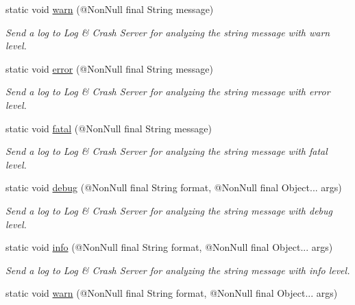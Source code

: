 \begin{DoxyCompactItemize}
static void \hyperlink{classcom_1_1toast_1_1android_1_1gamebase_1_1_gamebase_1_1_logger_ad6acf6b0724d6133534ddd54cc4f1b42}{warn} (@Non\+Null final String message)
\begin{DoxyCompactList}\small\item\em Send a log to Log \& Crash Server for analyzing the string message with warn level. \end{DoxyCompactList}\item 
static void \hyperlink{classcom_1_1toast_1_1android_1_1gamebase_1_1_gamebase_1_1_logger_a9d9271894eacdf4fe29901d4f0bf2254}{error} (@Non\+Null final String message)
\begin{DoxyCompactList}\small\item\em Send a log to Log \& Crash Server for analyzing the string message with error level. \end{DoxyCompactList}\item 
static void \hyperlink{classcom_1_1toast_1_1android_1_1gamebase_1_1_gamebase_1_1_logger_a372dc6703eff9082addb56057401a166}{fatal} (@Non\+Null final String message)
\begin{DoxyCompactList}\small\item\em Send a log to Log \& Crash Server for analyzing the string message with fatal level. \end{DoxyCompactList}\item 
static void \hyperlink{classcom_1_1toast_1_1android_1_1gamebase_1_1_gamebase_1_1_logger_a976460e1331501a44c47449a487140fb}{debug} (@Non\+Null final String format, @Non\+Null final Object... args)
\begin{DoxyCompactList}\small\item\em Send a log to Log \& Crash Server for analyzing the string message with debug level. \end{DoxyCompactList}\item 
static void \hyperlink{classcom_1_1toast_1_1android_1_1gamebase_1_1_gamebase_1_1_logger_a1b5b7e9f340d0bcd5384e74ff190826b}{info} (@Non\+Null final String format, @Non\+Null final Object... args)
\begin{DoxyCompactList}\small\item\em Send a log to Log \& Crash Server for analyzing the string message with info level. \end{DoxyCompactList}\item 
static void \hyperlink{classcom_1_1toast_1_1android_1_1gamebase_1_1_gamebase_1_1_logger_a3fe80dda3a14124e6e0ec1309597be55}{warn} (@Non\+Null final String format, @Non\+Null final Object... args)

\end{DoxyCompactItemize}
